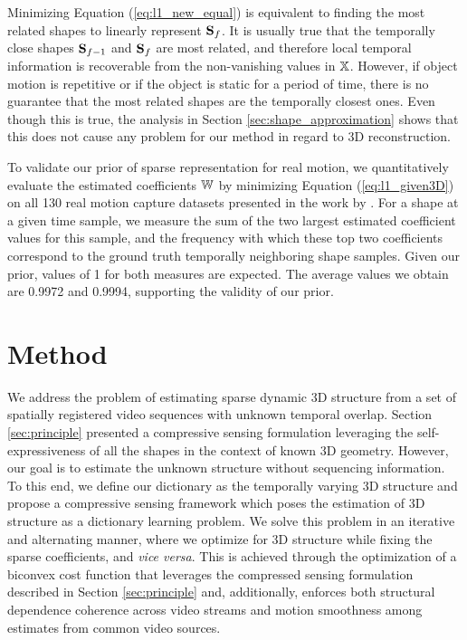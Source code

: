 Minimizing Equation (\ref{eq:l1_new_equal}) is equivalent to finding the most related shapes to linearly represent $\mathbf S_f$. It is usually true that the temporally close shapes $\mathbf S_{f-1}$ and $\mathbf S_{f}$ are most related, and therefore local temporal information is recoverable from the non-vanishing values in $\mathbb X$. However, if object motion is repetitive or if the object is static for a period of time, there is no guarantee that the most related shapes are the temporally closest ones. Even though this is true, the analysis in Section \ref{sec:shape_approximation} shows that this does not cause any problem for our method in regard to 3D reconstruction. 

To validate our prior of sparse representation for real motion, we quantitatively evaluate the estimated coefficients $\mathbb W$ by minimizing Equation (\ref{eq:l1_given3D}) on all 130 real motion capture datasets presented in the work by \citet{cg-2007-2}. 
For a shape at a given time sample, we measure the sum of the two largest estimated coefficient values for this sample, and the frequency with which these top two coefficients correspond to the ground truth temporally neighboring shape samples. Given our prior, values of 1 for both measures are expected. The average values we obtain are 0.9972 and 0.9994, supporting the validity of our prior.



\section{Method}
\label{sec:method}

We address the problem of estimating sparse dynamic 3D structure from a set of spatially registered video sequences with unknown temporal overlap.
Section \ref{sec:principle} presented a compressive sensing formulation leveraging the self-expressiveness of all the shapes in the context of known 3D geometry.
However, our goal is to estimate the unknown structure without sequencing information.
To this end, we define our dictionary as the temporally varying 3D structure and propose a compressive sensing framework which poses the estimation of 3D structure as a dictionary learning problem.
We solve this problem in an iterative and alternating manner, where we optimize for 3D structure while fixing the sparse coefficients, and {\em vice versa}.
This is achieved through the optimization of a biconvex cost function that leverages the compressed sensing formulation described in Section \ref{sec:principle}  and, additionally, enforces both structural dependence coherence across video streams and motion smoothness among estimates from common video sources.

